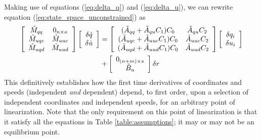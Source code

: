 Making use of equations (\ref{eq:delta_q}) and (\ref{eq:delta_u}), we can
rewrite equation (\ref{eq:state_space_unconstrained}) as
\begin{align}
  \label{eq:state_space_constrained}
  \left[
    \begin{array}{cc}
      \tilde{M}_{qq} & 0_{n \times o} \\
      \tilde{M}_{uqc} & \tilde{M}_{uuc} \\
      \tilde{M}_{uqd} & \tilde{M}_{uud}
    \end{array}
    \right]
    \left[
      \begin{array}{c}
        \delta \dot{q} \\
        \delta \dot{u}
      \end{array}
    \right]
   &=
   \left[
     \begin{array}{cc}
       (\tilde{A}_{qq} + \tilde{A}_{qu} C_1 ) C_0 & \tilde{A}_{qu} C_2 \\
       (\tilde{A}_{uqc} + \tilde{A}_{uuc} C_1 ) C_0 & \tilde{A}_{uuc} C_2\\
       (\tilde{A}_{uqd} + \tilde{A}_{uud} C_1 ) C_0 & \tilde{A}_{uud} C_2
     \end{array}
   \right]
    \left[
      \begin{array}{c}
        \delta q_i \\
        \delta u_i
      \end{array}
    \right]
    \notag \\
    &+\left[
      \begin{array}{c}
        0_{(n+m) \times s} \\
        \tilde{B}_{u}
      \end{array}
    \right]
    \delta r
\end{align}
This definitively establishes how the first time derivatives of coordinates and
speeds (independent \textit{and} dependent) depend, to first order, upon a
selection of independent coordinates and independent speeds, for an arbitrary
point of linearization. Note that the only requirement on this point of
linearization is that it satisfy all the equations in Table
\ref{table:assumptions}; it may or may not be an equilibrium point.

